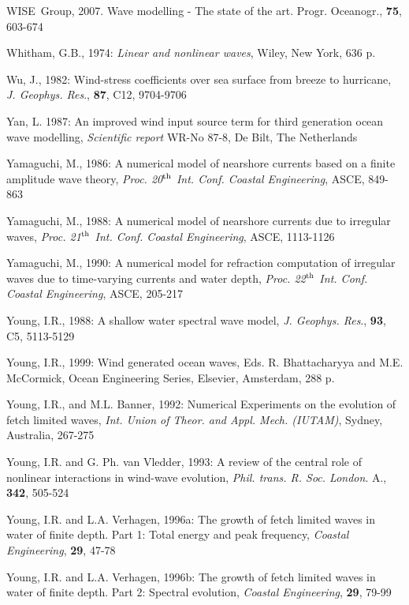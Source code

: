 \documentclass[12pt]{book}
\begin{document}
\begin{thebibliography}{10}
WISE~Group, 2007. Wave modelling - The state of the art. Progr. Oceanogr., {\bf 75}, 603-674

Whitham, G.B., 1974: {\it Linear and nonlinear waves}, Wiley, New York, 636 p.

Wu, J., 1982: Wind-stress coefficients over sea surface from breeze to hurricane, {\it J. Geophys. Res}., {\bf 87},
C12, 9704-9706

Yan, L. 1987: An improved wind input source term for third generation ocean wave modelling, {\it Scientific
report} WR-No 87-8, De Bilt, The Netherlands

Yamaguchi, M., 1986: A numerical model of nearshore currents based on a finite amplitude wave theory,
{\it Proc. 20$^{{\rm th}}$ Int. Conf. Coastal Engineering}, ASCE, 849-863

Yamaguchi, M., 1988: A numerical model of nearshore currents due to irregular waves, {\it Proc. 21$^{{\rm th}}$ Int.
Conf. Coastal Engineering}, ASCE, 1113-1126

Yamaguchi, M., 1990: A numerical model for refraction computation of irregular waves due to time-varying
currents and water depth, {\it Proc. 22$^{{\rm th}}$ Int. Conf. Coastal Engineering}, ASCE, 205-217

Young, I.R., 1988: A shallow water spectral wave model, {\it J. Geophys. Res}., {\bf 93}, C5, 5113-5129

Young, I.R., 1999: Wind generated ocean waves, Eds. R. Bhattacharyya and M.E. McCormick, Ocean Engineering Series,
Elsevier, Amsterdam, 288 p.

Young, I.R., and M.L. Banner, 1992: Numerical Experiments on the evolution of fetch limited waves, {\it Int.
Union of Theor. and Appl. Mech. (IUTAM)}, Sydney, Australia, 267-275

Young, I.R. and G. Ph. van Vledder, 1993: A review of the central role of nonlinear interactions in wind-wave evolution,
{\it Phil. trans. R. Soc. London}. A., {\bf 342}, 505-524

Young, I.R. and L.A. Verhagen, 1996a: The growth of fetch limited waves in water of finite depth. Part 1:
Total energy and peak frequency, {\it Coastal Engineering}, {\bf 29}, 47-78

Young, I.R. and L.A. Verhagen, 1996b: The growth of fetch limited waves in water of finite depth. Part 2:
Spectral evolution, {\it Coastal Engineering}, {\bf 29}, 79-99


\end{thebibliography}
\end{document}

